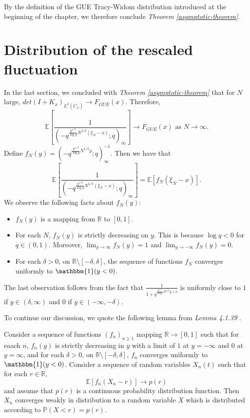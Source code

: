 By the definition of the GUE Tracy-Widom distribution introduced at the beginning of the chapter, we therefore conclude \textit{Theorem \ref{asymptotic-theorem}}.

\section{Distribution of the rescaled fluctuation}
In the last section, we concluded with \textit{Theorem \ref{asymptotic-theorem}} that for $N$ large, $det(I+K_x)_{L^2(C_{\varphi})} \rightarrow F_{GUE}(x)$. Therefore, 
\begin{equation}
\label{finale-equality}
\mathbb{E} \left[ \frac{1}{( -q^{ \frac{\chi^{1/3}}{\log q} N^{1/3} (\xi_N - x) }; q )_{\infty}} \right] \rightarrow F_{GUE}(x) \text{ as } N \rightarrow \infty.
\end{equation}
Define $f_N(y) = (-q^{\frac{\chi^{1/3}}{\log q} N^{1/3} y};q)_{\infty}^{-1}.$ Then we have that $$\mathbb{E} \left[ \frac{1}{( -q^{ \frac{\chi^{1/3}}{\log q} N^{1/3} (\xi_N - x) }; q )_{\infty}} \right] = \mathbb{E} \left[ f_N(\xi_N - x) \right].$$ We observe the following facts about $f_N(y)$:
\begin{itemize}
\item $f_N(y)$ is a mapping from $\mathbb{R}$ to $[0,1]$.
\item For each $N$, $f_N(y)$ is strictly decreasing on $y$. This is because $\log q < 0$ for $q \in (0,1)$. Moreover, $\lim_{y \rightarrow \infty} f_N(y) = 1$ and $\lim_{y \rightarrow -\infty} f_N(y) = 0$.
\item For each $\delta > 0$, on $\mathbb{R} \setminus [-\delta, \delta]$, the sequence of functions $f_N$ converges uniformly to $\mathbbm{1}(y < 0)$.
\end{itemize}
The last observation follows from the fact that $\frac{1}{1+q^{\frac{\chi^{1/3}}{\log q} N^{1/3} y + k}}$ is uniformly close to $1$ if $y \in (\delta, \infty)$ and $0$ if $y \in (-\infty, -\delta)$.

To continue our discussion, we quote the following lemma from \textit{\cite{macdonald2014} Lemma 4.1.39 }. 
\begin{lemma}
Consider a sequence of functions $(f_n)_{n \ge 1}$ mapping $\mathbb{R} \rightarrow [0,1]$ such that for eaach $n$, $f_n(y)$ is strictly decreasing in $y$ with a limit of $1$ at $y = -\infty$ and $0$ at $y = \infty$, and for each $\delta > 0$, on $\mathbb{R} \setminus [-\delta, \delta]$, $f_n$ converges uniformly to $\mathbbm{1}(y < 0)$. Consider a sequence of random variables $X_n(t)$ such that for each $r \in \mathbb{R}$, $$\mathbb{E} [f_n(X_n - r)] \rightarrow p(r)$$ and assume that $p(r)$ is a continuous probability distribution function. Then $X_n$ converges weakly in distribution to a random variable $X$ which is distributed according to $\mathbb{P}(X < r) = p(r)$.
\end{lemma}

